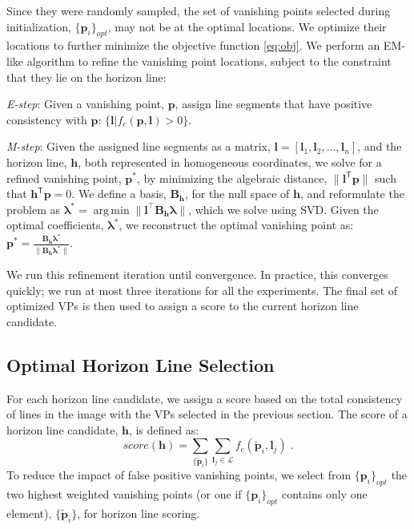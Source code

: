 Since they were randomly sampled, the set of vanishing points
selected during initialization, $\{\mathbf{p}_i\}_{opt}$, may not be at the
optimal locations.  We optimize their locations to further minimize
the objective function \eqref{eq:obj}. We perform an EM-like algorithm
to refine the vanishing point locations, subject to the constraint
that they lie on the horizon line:
\begin{compactitem}

\item \emph{E-step}: Given a vanishing point, $\mathbf{p}$, assign
  line segments that have positive consistency with $\mathbf{p}$:
  $\{\mathbf{l}|f_c(\mathbf{p},\mathbf{l}) > 0\}$.
\item \emph{M-step}: Given the assigned line segments as a matrix,
  $\mathbf{l} = [\mathbf{l}_1, \mathbf{l}_2,\dots ,\mathbf{l}_n]$, and the horizon line,
  $\mathbf{h}$, both represented in homogeneous coordinates, we 
  solve for a refined vanishing point, $\mathbf{p}^*$, by minimizing the algebraic distance, $\|
  \mathbf{l}^\mathsf{T} \mathbf{p} \|$ such that $\mathbf{h}^\mathsf{T} \mathbf{p} = 0$. We define a
  basis, $\mathbf{B}_\mathbf{h}$, for the null space of $\mathbf{h}$, and reformulate
  the problem as $\mathbf{\lambda}^* = \operatorname*{arg\,min} \|
  \mathbf{l}^\top \mathbf{B}_\mathbf{h} \mathbf{\lambda} \|$, which we solve using SVD.
  Given the optimal coefficients, $\mathbf{\lambda}^*$, we reconstruct
  the optimal vanishing point as: $\mathbf{p}^* =
  \frac{\mathbf{B}_\mathbf{h}\mathbf{\lambda}^*}
  {\|\mathbf{B}_\mathbf{h}\mathbf{\lambda}^*\|}$.

\end{compactitem}

We run this refinement iteration until convergence. In practice, this
converges quickly; we run at most three iterations for all the
experiments. The final set of optimized VPs is then used to assign a
score to the current horizon line candidate.

\subsection{Optimal Horizon Line Selection}
\label{sec:horizonscoring}

For each horizon line candidate, we assign a score based on the total
consistency of lines in the image with the VPs selected in the
previous section.  The score of a horizon line candidate, $\mathbf{h}$, is
defined as:
\begin{equation}
  score(\mathbf{h}) = \sum_{\{\tilde{\mathbf{p}}_i\}} \sum_{\mathbf{l}_j \in
    \mathcal{L}}f_c(\tilde{\mathbf{p}}_i, \mathbf{l}_j) \; .
\end{equation}
To reduce the impact of false positive vanishing points, we select
from $\{\mathbf{p}_i\}_{opt}$ the two highest weighted vanishing points (or
one if $\{\mathbf{p}_i\}_{opt}$ contains only one element),
$\{\tilde{\mathbf{p}}_i\}$, for horizon line scoring.

